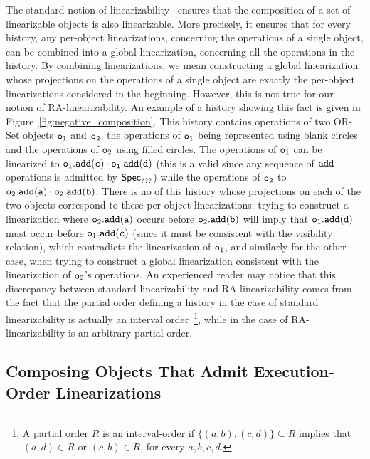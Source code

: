 The standard notion of linearizability~\cite{HerlihyW90} ensures that the composition of a set of linearizable objects is also linearizable. More precisely, it ensures that for every history, any per-object linearizations, concerning the operations of a single object, can be combined into a global linearization, concerning all the operations in the history. By combining linearizations, we mean constructing a global linearization whose projections on the operations of a single object are exactly the per-object linearizations considered in the beginning.
However, this is not true for our notion of RA-linearizability. An example of a history showing this fact is given in Figure~\ref{fig:negative_composition}. This history contains operations of two OR-Set objects $\mathtt{o}_1$ and $\mathtt{o}_2$, the operations of $\mathtt{o}_1$ being represented using blank circles and the operations of $\mathtt{o}_2$ using filled circles. The operations of $\mathtt{o}_1$ can be linearized to $\aobj_1.\alabelshort[{\tt add}]{c}\cdot \aobj_1.\alabelshort[{\tt add}]{d}$ (this is a valid \crdtlinearization{} since any sequence of ${\tt add}$ operations is admitted by $\mathsf{Spec}_{???}$) while the operations of $\mathtt{o}_2$ to $\aobj_2.\alabelshort[{\tt add}]{a}\cdot \aobj_2.\alabelshort[{\tt add}]{b}$. There is no \crdtlinearization{} of this history whose projections on each of the two objects correspond to these per-object linearizations: trying to construct a linearization where $\aobj_2.\alabelshort[{\tt add}]{a}$ occurs before $\aobj_2.\alabelshort[{\tt add}]{b}$ will imply that $\aobj_1.\alabelshort[{\tt add}]{d}$ must occur before $\aobj_1.\alabelshort[{\tt add}]{c}$ (since it must be consistent with the visibility relation), which contradicts the linearization of $\mathtt{o}_1$, and similarly for the other case, when trying to construct a global linearization consistent with the linearization of $\mathtt{o}_2$'s operations. An experienced reader may notice that this discrepancy between standard linearizability and RA-linearizability comes from the fact that the partial order defining a history in the case of standard linearizability is actually an interval order~\footnote{A partial order $R$ is an interval-order if $\{(a,b), (c,d)\} \subseteq R$ implies that $(a,d) \in R$ or $(c,b) \in R$, for every $a,b,c,d$.}, while in the case of RA-linearizability is an arbitrary partial order.

\subsection{Composing Objects That Admit Execution-Order Linearizations}

